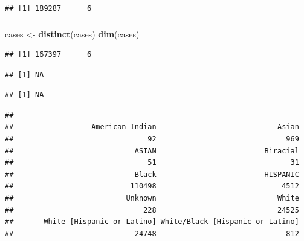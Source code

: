 \documentclass[]{article}
\newenvironment{Shaded}{\begin{snugshade}}{\end{snugshade}}
\newcommand{\KeywordTok}[1]{\textcolor[rgb]{0.13,0.29,0.53}{\textbf{#1}}}
\newcommand{\StringTok}[1]{\textcolor[rgb]{0.31,0.60,0.02}{#1}}
\newcommand{\OperatorTok}[1]{\textcolor[rgb]{0.81,0.36,0.00}{\textbf{#1}}}
\newcommand{\NormalTok}[1]{#1}
\begin{document}
\begin{verbatim}
## [1] 189287      6
\end{verbatim}

\subsubsection{}\label{section}

\begin{Shaded}
\begin{Highlighting}[]
\NormalTok{cases <-}\StringTok{ }\KeywordTok{distinct}\NormalTok{(cases)}
\KeywordTok{dim}\NormalTok{(cases)}
\end{Highlighting}
\end{Shaded}

\begin{verbatim}
## [1] 167397      6
\end{verbatim}

\begin{Shaded}
\end{Shaded}

\begin{verbatim}
## [1] NA
\end{verbatim}

\begin{Shaded}
\end{Shaded}

\begin{verbatim}
## [1] NA
\end{verbatim}

\begin{Shaded}
\end{Shaded}

\begin{verbatim}
## 
##                  American Indian                            Asian 
##                               92                              969 
##                            ASIAN                         Biracial 
##                               51                               31 
##                            Black                         HISPANIC 
##                           110498                             4512 
##                          Unknown                            White 
##                              228                            24525 
##       White [Hispanic or Latino] White/Black [Hispanic or Latino] 
##                            24748                              812
\end{verbatim}
\end{document}
